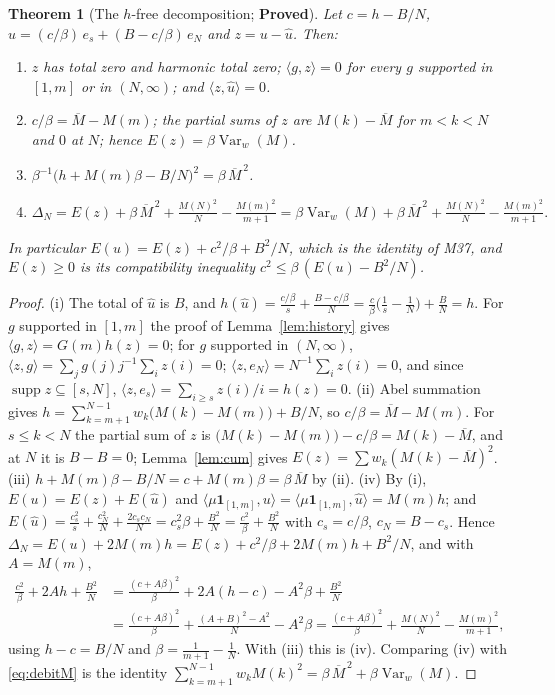 \documentclass[11pt]{article}
\newtheorem{theorem}{Theorem}[section]
\theoremstyle{definition}
\theoremstyle{remark}
\newcommand{\ip}[2]{\langle #1,#2\rangle}
\DeclareMathOperator{\supp}{supp}
\begin{document}
\begin{theorem}[The $h$-free decomposition; \textbf{Proved}]\label{thm:aroundh}
Let $c=h-B/N$, $\hat u=(c/\beta)\,e_s+(B-c/\beta)\,e_N$ and $z=u-\hat u$. Then:
\begin{enumerate}
\item[(i)] $z$ has total zero and harmonic total zero; $\ip gz=0$ for every $g$ supported in $[1,m]$ or in $(N,\infty)$; and $\ip z{\hat u}=0$.
\item[(ii)] $c/\beta=\overline M-M(m)$; the partial sums of $z$ are $M(k)-\overline M$ for $m<k<N$ and $0$ at $N$; hence $E(z)=\beta\operatorname{Var}_w(M)$.
\item[(iii)] $\beta^{-1}\big(h+M(m)\beta-B/N\big)^2=\beta\,\overline M^{\,2}$.
\item[(iv)] $\displaystyle \Delta_N=E(z)+\beta\,\overline M^{\,2}+\frac{M(N)^2}N-\frac{M(m)^2}{m+1}=\beta\operatorname{Var}_w(M)+\beta\,\overline M^{\,2}+\frac{M(N)^2}N-\frac{M(m)^2}{m+1}.$
\end{enumerate}
In particular $E(u)=E(z)+c^2/\beta+B^2/N$, which is the identity of M37, and $E(z)\ge0$ is its compatibility inequality $c^2\le\beta\,(E(u)-B^2/N)$.
\end{theorem}

\begin{proof}
(i) The total of $\hat u$ is $B$, and $h(\hat u)=\frac{c/\beta}s+\frac{B-c/\beta}N=\frac c\beta\big(\frac1s-\frac1N\big)+\frac BN=h$. For $g$ supported in $[1,m]$ the proof of Lemma~\ref{lem:history} gives $\ip gz=G(m)h(z)=0$; for $g$ supported in $(N,\infty)$, $\ip zg=\sum_jg(j)j^{-1}\sum_iz(i)=0$; $\ip z{e_N}=N^{-1}\sum_iz(i)=0$, and since $\supp z\subseteq[s,N]$, $\ip z{e_s}=\sum_{i\ge s}z(i)/i=h(z)=0$. (ii) Abel summation gives $h=\sum_{k=m+1}^{N-1}w_k\big(M(k)-M(m)\big)+B/N$, so $c/\beta=\overline M-M(m)$. For $s\le k<N$ the partial sum of $z$ is $\big(M(k)-M(m)\big)-c/\beta=M(k)-\overline M$, and at $N$ it is $B-B=0$; Lemma~\ref{lem:cum} gives $E(z)=\sum w_k(M(k)-\overline M)^2$. (iii) $h+M(m)\beta-B/N=c+M(m)\beta=\beta\,\overline M$ by (ii). (iv) By (i), $E(u)=E(z)+E(\hat u)$ and $\ip{\mu\mathbf 1_{[1,m]}}u=\ip{\mu\mathbf 1_{[1,m]}}{\hat u}=M(m)h$; and $E(\hat u)=\frac{c_s^2}s+\frac{c_N^2}N+\frac{2c_sc_N}N=c_s^2\beta+\frac{B^2}N=\frac{c^2}\beta+\frac{B^2}N$ with $c_s=c/\beta$, $c_N=B-c_s$. Hence $\Delta_N=E(u)+2M(m)h=E(z)+c^2/\beta+2M(m)h+B^2/N$, and with $A=M(m)$,
\begin{align*}
\frac{c^2}\beta+2Ah+\frac{B^2}N&=\frac{(c+A\beta)^2}\beta+2A(h-c)-A^2\beta+\frac{B^2}N\\
&=\frac{(c+A\beta)^2}\beta+\frac{(A+B)^2-A^2}N-A^2\beta=\frac{(c+A\beta)^2}\beta+\frac{M(N)^2}N-\frac{M(m)^2}{m+1},
\end{align*}
using $h-c=B/N$ and $\beta=\frac1{m+1}-\frac1N$. With (iii) this is (iv). Comparing (iv) with \eqref{eq:debitM} is the identity $\sum_{k=m+1}^{N-1}w_kM(k)^2=\beta\,\overline M^{\,2}+\beta\operatorname{Var}_w(M)$.
\end{proof}
\end{document}

